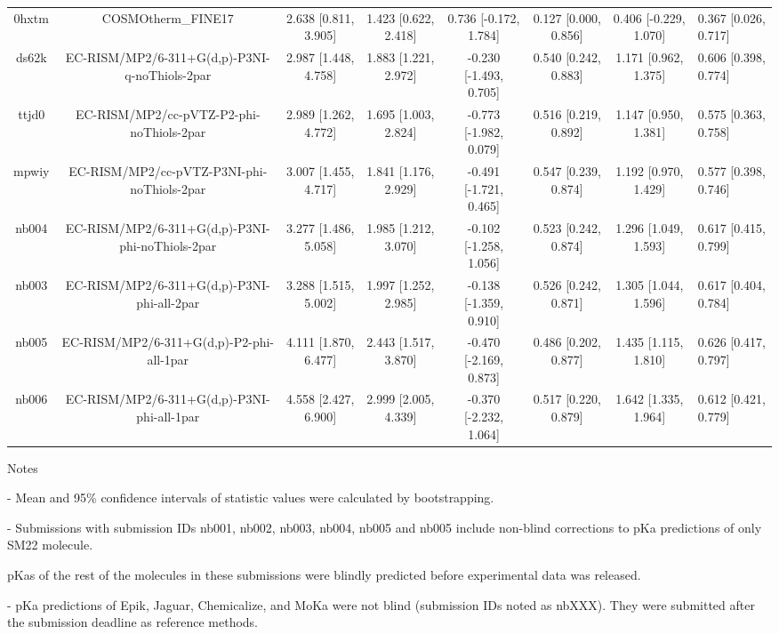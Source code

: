 \documentclass{article}
\begin{document}
\begin{center}
\begin{longtable}{|ccccccc|}
 0hxtm &                                 COSMOtherm\_FINE17 &  2.638 [0.811, 3.905] &  1.423 [0.622, 2.418] &    0.736 [-0.172, 1.784] &  0.127 [0.000, 0.856] &  0.406 [-0.229, 1.070] &   0.367 [0.026, 0.717] \\
 ds62k &      EC-RISM/MP2/6-311+G(d,p)-P3NI-q-noThiols-2par &  2.987 [1.448, 4.758] &  1.883 [1.221, 2.972] &   -0.230 [-1.493, 0.705] &  0.540 [0.242, 0.883] &   1.171 [0.962, 1.375] &   0.606 [0.398, 0.774] \\
 ttjd0 &           EC-RISM/MP2/cc-pVTZ-P2-phi-noThiols-2par &  2.989 [1.262, 4.772] &  1.695 [1.003, 2.824] &   -0.773 [-1.982, 0.079] &  0.516 [0.219, 0.892] &   1.147 [0.950, 1.381] &   0.575 [0.363, 0.758] \\
 mpwiy &         EC-RISM/MP2/cc-pVTZ-P3NI-phi-noThiols-2par &  3.007 [1.455, 4.717] &  1.841 [1.176, 2.929] &   -0.491 [-1.721, 0.465] &  0.547 [0.239, 0.874] &   1.192 [0.970, 1.429] &   0.577 [0.398, 0.746] \\
 nb004 &    EC-RISM/MP2/6-311+G(d,p)-P3NI-phi-noThiols-2par &  3.277 [1.486, 5.058] &  1.985 [1.212, 3.070] &   -0.102 [-1.258, 1.056] &  0.523 [0.242, 0.874] &   1.296 [1.049, 1.593] &   0.617 [0.415, 0.799] \\
 nb003 &         EC-RISM/MP2/6-311+G(d,p)-P3NI-phi-all-2par &  3.288 [1.515, 5.002] &  1.997 [1.252, 2.985] &   -0.138 [-1.359, 0.910] &  0.526 [0.242, 0.871] &   1.305 [1.044, 1.596] &   0.617 [0.404, 0.784] \\
 nb005 &           EC-RISM/MP2/6-311+G(d,p)-P2-phi-all-1par &  4.111 [1.870, 6.477] &  2.443 [1.517, 3.870] &   -0.470 [-2.169, 0.873] &  0.486 [0.202, 0.877] &   1.435 [1.115, 1.810] &   0.626 [0.417, 0.797] \\
 nb006 &         EC-RISM/MP2/6-311+G(d,p)-P3NI-phi-all-1par &  4.558 [2.427, 6.900] &  2.999 [2.005, 4.339] &   -0.370 [-2.232, 1.064] &  0.517 [0.220, 0.879] &   1.642 [1.335, 1.964] &   0.612 [0.421, 0.779] \\
\end{longtable}
\end{center}

Notes

- Mean and 95\% confidence intervals of statistic values were calculated by bootstrapping.

- Submissions with submission IDs nb001, nb002, nb003, nb004, nb005 and nb005 include non-blind corrections to pKa predictions of only SM22 molecule.

pKas of the rest of the molecules in these submissions were blindly predicted before experimental data was released.

- pKa predictions of Epik, Jaguar, Chemicalize, and MoKa were not blind (submission IDs noted as nbXXX). They were submitted after the submission deadline as reference methods.
\end{document}
